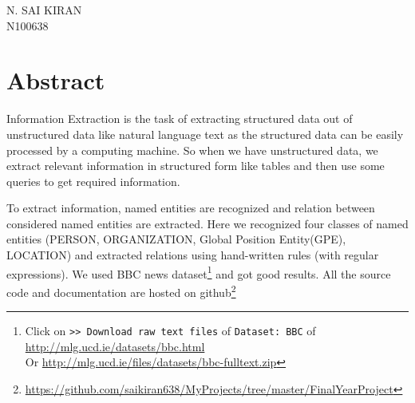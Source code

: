 \documentclass[12pt]{report}
\begin{document}
\begin{flushright}N. SAI KIRAN\\N100638\end{flushright}


\chapter*{Abstract}

\par Information Extraction is the task of extracting structured data out of unstructured
 data like natural language text as the structured data can be easily processed by a computing
  machine. So when we have unstructured data, we extract relevant information in structured form
   like tables and then use some queries to get required information.
\par To extract information, named entities are recognized and relation between considered named
 entities are extracted.
Here we recognized four classes of named entities (PERSON, ORGANIZATION,
Global Position Entity(GPE), LOCATION) and extracted relations using hand-written rules (with regular expressions).
We used BBC news dataset\footnote{Click on \texttt{>> Download raw text files} of \texttt{Dataset: BBC} of \url{http://mlg.ucd.ie/datasets/bbc.html}\\Or \url{http://mlg.ucd.ie/files/datasets/bbc-fulltext.zip}} and got good results.
 All the source code and documentation are hosted on github\footnote{\url{https://github.com/saikiran638/MyProjects/tree/master/FinalYearProject}}

\pagestyle{empty} %
\tableofcontents %
\cleardoublepage %
\pagestyle{plain} %
\setcounter{page}{1} %
\end{document}
